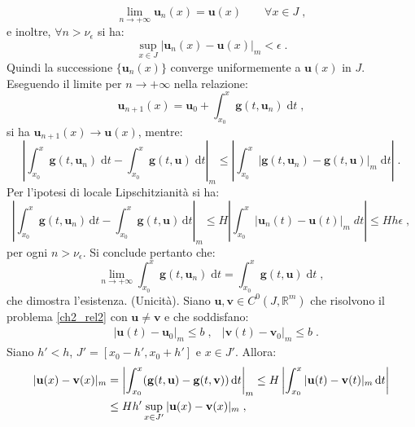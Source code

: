 \documentclass[a4paper,12pt]{report}
\theoremstyle{plain}
\theoremstyle{definition}
\theoremstyle{remark}
\newcommand{\diff}[1]{\mathrm{d}#1}
\numberwithin{equation}{section}
\begin{document}
\begin{equation}
\lim_{n \to +\infty} \mathbf{u}_n(x)=\mathbf{u}(x) \qquad \forall x \in J\;,
\end{equation}
e inoltre, $\forall n>\nu_{\epsilon}$ si ha:
\begin{equation}
\sup_{x \in J} |\mathbf{u}_n(x)-\mathbf{u}(x)|_m < \epsilon\;.
\end{equation}
Quindi la successione $\{ \mathbf{u}_n(x)\}$ converge uniformemente a $\mathbf{u}(x)$ in $J$. Eseguendo il limite per $n \to +\infty$
nella relazione:
\begin{equation}
\mathbf{u}_{n+1}(x)=\mathbf{u}_0+\int_{x_0}^x \mathbf{g}(t,\mathbf{u}_n)\;\diff{t}\;,
\end{equation}
si ha $\mathbf{u}_{n+1}(x) \to \mathbf{u}(x)$, mentre:
\begin{equation}
\left| \int_{x_0}^x \mathbf{g}(t,\mathbf{u}_n)\;\diff{t} - \int_{x_0}^x \mathbf{g}(t,\mathbf{u})\;\diff{t}\right|_m \le
\left| \int_{x_0}^x |\mathbf{g}(t,\mathbf{u}_n) - \mathbf{g}(t,\mathbf{u})|_m\;\diff{t}\right|\;.
\end{equation}
Per l'ipotesi di locale Lipschitzianità si ha:
\begin{equation}
\left|\int_{x_0}^x\mathbf{g}(t,\mathbf{u}_n)\,\diff{t}-\int_{x_0}^x\mathbf{g}(t,\mathbf{u})\,\diff{t}\right|_m \le H \left|\int_{x_0}^x |\mathbf{u}_n(t)-\mathbf{u}(t)|_m\;dt\right| \le Hh\epsilon\;,
\end{equation}
per ogni $n>\nu_{\epsilon}$. Si conclude pertanto che:
\begin{equation}
\lim_{n \to +\infty} \int_{x_0}^x \mathbf{g}(t,\mathbf{u}_n)\;\diff{t} = \int_{x_0}^x \mathbf{g}(t,\mathbf{u})\;\diff{t}\;,
\end{equation}
che dimostra l'esistenza.
\endproof
\proof (Unicità). Siano $\mathbf{u},\mathbf{v}\in C^0(J,\mathbb{R}^m)$ che risolvono il problema \eqref{ch2_rel2} con $\mathbf{u} \ne \mathbf{v}$ e che soddisfano:
\begin{align}
&|\mathbf{u}(t)-\mathbf{u}_0|_m\le b\;, &|\mathbf{v}(t)-\mathbf{v}_0|_m\le b\;.
\end{align}
Siano $h'<h$, $J'=[x_0-h',x_0+h']$ e $x \in J'$. Allora:
\begin{align}
|\mathbf{u}(x)-\mathbf{v}(x)|_m &=\left|\int_{x_0}^x(\mathbf{g}(t,\mathbf{u})-\mathbf{g}(t,\mathbf{v}))\,\diff{t}\right|_m\le H \left|\int_{x_0}^x |\mathbf{u}(t)-\mathbf{v}(t)|_m\,\diff{t}\right| \notag \\
&\le Hh'\sup_{x\in J'}|\mathbf{u}(x)-\mathbf{v}(x)|_m\;,
\end{align}
\end{document}
